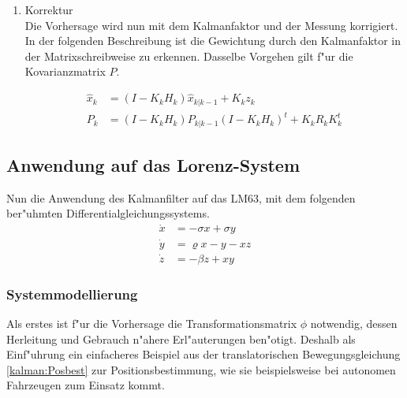 \begin{refsection}
\begin{enumerate}
\item Korrektur\\
Die Vorhersage wird nun mit dem Kalmanfaktor und der Messung korrigiert. In der folgenden Beschreibung ist die Gewichtung durch den Kalmanfaktor in der Matrixschreibweise zu erkennen. Dasselbe Vorgehen gilt f"ur die Kovarianzmatrix $P$.

\begin{align*}
\hat{x}_{k}&=(I-K_{k}H_{k})\hat{x}_{k|k-1}+K_{k}z_{k} \\
P_{k} &=(I-K_{k}H_{k})P_{k|k-1}(I-K_{k}H_{k})^{t}+K_{k}R_{k}K^{t}_{k}  \end{align*}
\end{enumerate}

\subsection{Anwendung auf das Lorenz-System}
Nun die Anwendung des Kalmanfilter auf das LM63, mit dem folgenden ber"uhmten Differentialgleichungssystems.
\begin{align}
\dot x &= -\sigma x + \sigma y\\
\dot y &= \varrho x - y - x z\\
\dot z &= -\beta z + x y
\label{kalman:lm63} 
\end{align}

\subsubsection{Systemmodellierung}
Als erstes ist f"ur die Vorhersage die Transformationsmatrix $\phi$ notwendig, dessen Herleitung und Gebrauch n"ahere Erl"auterungen ben"otigt. Deshalb als Einf"uhrung ein einfacheres Beispiel aus der translatorischen Bewegungsgleichung \eqref{kalman:Posbest} zur Positionsbestimmung, wie sie beispielsweise bei autonomen Fahrzeugen zum Einsatz kommt.


\end{refsection}
